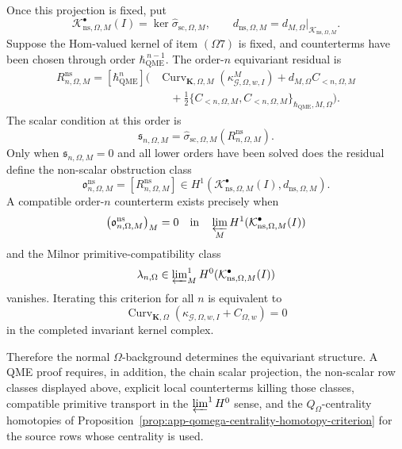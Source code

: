 \begin{thm}
  Once this projection is fixed, put
  \[
    \mathcal K^\bullet_{\mathrm{ns},\Omega,M}(I)
      =
    \ker\widehat\sigma_{\mathrm{sc},\Omega,M},
    \qquad
    d_{\mathrm{ns},\Omega,M}
      =
    d_{M,\Omega}|_{\mathcal K_{\mathrm{ns},\Omega,M}} .
  \]
  Suppose the Hom-valued kernel of item \((\Omega7)\) is fixed, and
  counterterms have been chosen through order
  \(\hbar_{\mathrm{QME}}^{\,n-1}\).  The
  order-\(n\) equivariant residual is
  \[
  \begin{aligned}
    R^{\mathrm{ns}}_{n,\Omega,M}
      =
    [\hbar_{\mathrm{QME}}^n]\biggl(
      &\operatorname{Curv}_{\mathbf K,\Omega,M}
        (\kappa^M_{\mathcal G,\Omega,w,I})
       +d_{M,\Omega}C_{<n,\Omega,M} \\
      &\quad
       +\frac12
        \{C_{<n,\Omega,M},C_{<n,\Omega,M}\}
          _{\hbar_{\mathrm{QME}},M,\Omega}
    \biggr).
  \end{aligned}
  \]
  The scalar condition at this order is
  \[
    \mathfrak s_{n,\Omega,M}
      =
    \widehat\sigma_{\mathrm{sc},\Omega,M}
      (R^{\mathrm{ns}}_{n,\Omega,M}).
  \]
  Only when \(\mathfrak s_{n,\Omega,M}=0\) and all lower orders have been
  solved does the residual define the non-scalar obstruction class
  \[
    \mathfrak o^{\mathrm{ns}}_{n,\Omega,M}
      =
    [R^{\mathrm{ns}}_{n,\Omega,M}]
      \in
    H^1\!\left(
      \mathcal K^\bullet_{\mathrm{ns},\Omega,M}(I),
      d_{\mathrm{ns},\Omega,M}
    \right).
  \]
  A compatible order-\(n\) counterterm exists precisely when
  \[
    \bigl(\mathfrak o^{\mathrm{ns}}_{n,\Omega,M}\bigr)_M=0
    \quad\text{in}\quad
    \varprojlim_M
    H^1(\mathcal K^\bullet_{\mathrm{ns},\Omega,M}(I))
  \]
  and the Milnor primitive-compatibility class
  \[
    \lambda_{n,\Omega}
      \in
    \varprojlim\nolimits^1_M
    H^0(\mathcal K^\bullet_{\mathrm{ns},\Omega,M}(I))
  \]
  vanishes.  Iterating this criterion for all \(n\) is equivalent to
  \[
    \operatorname{Curv}_{\mathbf K,\Omega}
      (\kappa_{\mathcal G,\Omega,w,I}+C_{\Omega,w})
      =0
  \]
  in the completed invariant kernel complex.

  Therefore the normal \(\Omega\)-background determines the
  equivariant structure.  A QME proof requires, in addition, the chain
  scalar projection, the
  non-scalar row classes displayed above, explicit local counterterms
  killing those classes, compatible primitive transport in the
  \(\varprojlim^1H^0\) sense, and the \(Q_\Omega\)-centrality homotopies of
  Proposition~\ref{prop:app-qomega-centrality-homotopy-criterion} for the
  source rows whose centrality is used.
\end{thm}

